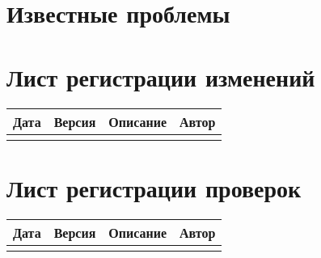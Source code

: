 \documentclass[a4paper]{report}
\begin{document}
	\chapter{Известные проблемы}
	
	\chapter*{Лист регистрации изменений}
		\begin{tabularx}{\textwidth}{ 
				| >{\centering\arraybackslash}X 
				| >{\centering\arraybackslash}X 
				| >{\centering\arraybackslash}X
				| >{\centering\arraybackslash}X |}
			\hline
			\textbf{Дата} & \textbf{Версия} & \textbf{Описание} & \textbf{Автор} \\
			\hline
			&&& \\
			\hline
		\end{tabularx}
	\chapter*{Лист регистрации проверок}
		\begin{tabularx}{\textwidth}{ 
				| >{\centering\arraybackslash}X 
				| >{\centering\arraybackslash}X 
				| >{\centering\arraybackslash}X
				| >{\centering\arraybackslash}X |}
			\hline
			\textbf{Дата} & \textbf{Версия} & \textbf{Описание} & \textbf{Автор} \\
			\hline
			&&& \\
			\hline
		\end{tabularx}
\end{document}
